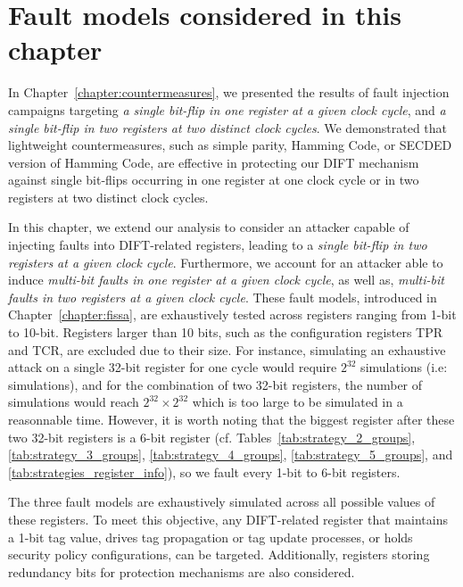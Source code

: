 \section{Fault models considered in this chapter}
\label{section:chap6_faultmodels}
In Chapter~\ref{chapter:countermeasures}, we presented the results of fault injection campaigns targeting \textit{a single bit-flip in one register at a given clock cycle}, and \textit{a single bit-flip in two registers at two distinct clock cycles}. We demonstrated that lightweight countermeasures, such as simple parity, Hamming Code, or SECDED version of Hamming Code, are effective in protecting our DIFT mechanism against single bit-flips occurring in one register at one clock cycle or in two registers at two distinct clock cycles.

In this chapter, we extend our analysis to consider an attacker capable of injecting faults into DIFT-related registers, leading to a \textit{single bit-flip in two registers at a given clock cycle}. Furthermore, we account for an attacker able to induce \textit{multi-bit faults in one register at a given clock cycle}, as well as, \textit{multi-bit faults in two registers at a given clock cycle}. These fault models, introduced in Chapter~\ref{chapter:fissa}, are exhaustively tested across registers ranging from 1-bit to 10-bit. Registers larger than 10 bits, such as the configuration registers TPR and TCR, are excluded due to their size. For instance, simulating an exhaustive attack on a single 32-bit register for one cycle would require $2^{32}$ simulations (i.e:  simulations), and for the combination of two 32-bit registers, the number of simulations would reach $2^{32} \times 2^{32}$ which is too large to be simulated in a reasonnable time. However, it is worth noting that the biggest register after these two 32-bit registers is a 6-bit register (cf. Tables~\ref{tab:strategy_2_groups}, \ref{tab:strategy_3_groups}, \ref{tab:strategy_4_groups}, \ref{tab:strategy_5_groups}, and \ref{tab:strategies_register_info}), so we fault every 1-bit to 6-bit registers.

The three fault models are exhaustively simulated across all possible values of these registers. To meet this objective, any DIFT-related register that maintains a 1-bit tag value, drives tag propagation or tag update processes, or holds security policy configurations, can be targeted. Additionally, registers storing redundancy bits for protection mechanisms are also considered.

